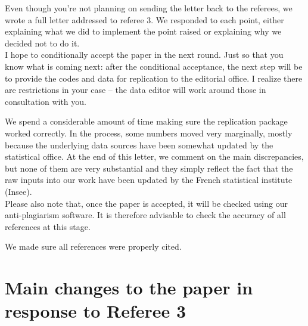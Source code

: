 \documentclass[11pt]{article}
\newcommand{\comment}[1]{\begingroup #1\endgroup}
\newcommand{\answer}[1]{\begingroup\color{navy}#1\endgroup}
\begin{document}
\answer{Even though you're not planning on sending the letter back to the referees, we wrote a full letter addressed to referee 3. We responded to each point, either explaining what we did to implement the point raised or explaining why we decided not to do it.}\\


\comment{I hope to conditionally accept the paper in the next round. Just so that you know what is coming next: after the conditional acceptance, the next step will be to provide the codes and data for replication to the editorial office. I realize there are restrictions in your case -- the data editor will work around those in consultation with you.}\par

\answer{We spend a considerable amount of time making sure the replication package worked correctly. In the process, some numbers moved very marginally, mostly because the underlying data sources have been somewhat updated by the statistical office. At the end of this letter, we comment on the main discrepancies, but none of them are very substantial and they simply reflect the fact that the raw inputs into our work have been updated by the French statistical institute (Insee). }\\


\comment{Please also note that, once the paper is accepted, it will be checked using our anti-plagiarism software. It is therefore advisable to check the accuracy of all references at this stage.}\par

\answer{We made sure all references were properly cited.}\par





%
%
%

\section*{Main changes to the paper in response to Referee 3}
\end{document}
